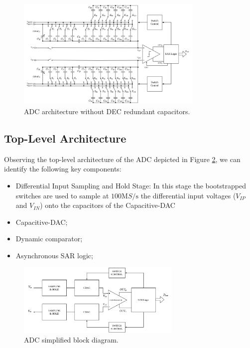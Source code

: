 \begin{figure}[h]
    \centering
    \includegraphics[width=0.8\textwidth]{Images/ADC-arch.png}
    \caption{ADC architecture without DEC redundant capacitors.}
    \label{fig:ADC-sch-no-DEC}
\end{figure}

\subsection{Top-Level Architecture}

Observing the top-level architecture of the ADC depicted in Figure \ref{fig:ADC-block-diagram}, we can identify the following key components:
\begin{itemize}
    \item Differential Input Sampling and Hold Stage: In this stage the bootstrapped switches are used to sample at $100 \si{\mega S \per \second}$ the differential input voltages ($V_{IP}$ and $V_{IN}$) onto the capacitors of the Capacitive-DAC 
    \item Capacitive-DAC;
    \item Dynamic comparator;
    \item Asynchronous SAR logic;
\end{itemize}

\begin{figure}[H]
    \centering
    \includegraphics[width=0.7\textwidth]{Images/ADC-block-diagram.png}
    \caption{ADC simplified block diagram.}
    \label{fig:ADC-block-diagram}
\end{figure}

